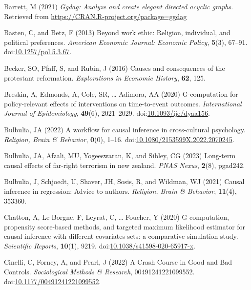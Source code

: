 \documentclass[
  singlecolumn,
  9pt]{article}
\newlength{\cslhangindent}
\newenvironment{CSLReferences}[2] %
 {\begin{list}{}{%
  \setlength{\itemindent}{0pt}
  \setlength{\leftmargin}{0pt}
  \setlength{\parsep}{0pt}
  \ifodd #1
   \setlength{\leftmargin}{\cslhangindent}
   \setlength{\itemindent}{-1\cslhangindent}
  \fi
  \setlength{\itemsep}{#2\baselineskip}}}
 {\end{list}}
\begin{document}
\label{refs}
\begin{CSLReferences}{1}{0}
Barrett, M (2021) \emph{Ggdag: Analyze and create elegant directed
acyclic graphs}. Retrieved from
\url{https://CRAN.R-project.org/package=ggdag}

Basten, C, and Betz, F (2013) Beyond work ethic: Religion, individual,
and political preferences. \emph{American Economic Journal: Economic
Policy}, \textbf{5}(3), 67--91.
doi:\href{https://doi.org/10.1257/pol.5.3.67}{10.1257/pol.5.3.67}.

Becker, SO, Pfaff, S, and Rubin, J (2016) Causes and consequences of the
protestant reformation. \emph{Explorations in Economic History},
\textbf{62}, 125.

Breskin, A, Edmonds, A, Cole, SR, \ldots{} Adimora, AA (2020)
G-computation for policy-relevant effects of interventions on
time-to-event outcomes. \emph{International Journal of Epidemiology},
\textbf{49}(6), 2021--2029.
doi:\href{https://doi.org/10.1093/ije/dyaa156}{10.1093/ije/dyaa156}.

Bulbulia, JA (2022) A workflow for causal inference in cross-cultural
psychology. \emph{Religion, Brain \& Behavior}, \textbf{0}(0), 1--16.
doi:\href{https://doi.org/10.1080/2153599X.2022.2070245}{10.1080/2153599X.2022.2070245}.

Bulbulia, JA, Afzali, MU, Yogeeswaran, K, and Sibley, CG (2023)
Long-term causal effects of far-right terrorism in new zealand.
\emph{PNAS Nexus}, \textbf{2}(8), pgad242.

Bulbulia, J, Schjoedt, U, Shaver, JH, Sosis, R, and Wildman, WJ (2021)
Causal inference in regression: Advice to authors. \emph{Religion, Brain
\& Behavior}, \textbf{11}(4), 353360.

Chatton, A, Le Borgne, F, Leyrat, C, \ldots{} Foucher, Y (2020)
G-computation, propensity score-based methods, and targeted maximum
likelihood estimator for causal inference with different covariates
sets: a comparative simulation study. \emph{Scientific Reports},
\textbf{10}(1), 9219.
doi:\href{https://doi.org/10.1038/s41598-020-65917-x}{10.1038/s41598-020-65917-x}.

Cinelli, C, Forney, A, and Pearl, J (2022) A Crash Course in Good and
Bad Controls. \emph{Sociological Methods \& Research},
00491241221099552.
doi:\href{https://doi.org/10.1177/00491241221099552}{10.1177/00491241221099552}.


\end{CSLReferences}
\end{document}
